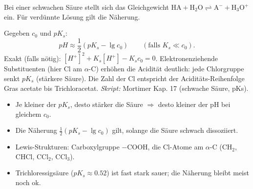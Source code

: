 

Bei einer schwachen Säure stellt sich das Gleichgewicht
$\mathrm{HA}+\mathrm{H_2O}\rightleftharpoons\mathrm{A^-}+\mathrm{H_3O^+}$
ein. Für verdünnte Lösung gilt die Näherung.

\begin{werkzeugkasten}
Gegeben $c_0$ und $pK_s$:
\[
  pH \approx \frac{1}{2}\left(pK_s - \lg c_0\right)
  \qquad(\text{falls } K_s \ll c_0).
\]
Exakt (falls nötig): $[H^+]^2 + K_s[H^+]-K_s c_0 = 0$. Elektronenziehende
Substituenten (hier Cl am $\alpha$-C) erhöhen die Acidität deutlich:
jede Chlorgruppe senkt $pK_s$ (stärkere Säure). Die Zahl der Cl
entspricht der Aciditäts-Reihenfolge Gras acetate bis Trichloracetat.
\textit{Skript:} Mortimer Kap. 17 (schwache Säure, pKs).
\end{werkzeugkasten}

\begin{achtung}
\begin{itemize}
  \item Je kleiner der $pK_s$, desto stärker die Säure $\Rightarrow$ desto
        kleiner der pH bei gleichem $c_0$.
  \item Die Näherung $\frac12(pK_s-\lg c_0)$ gilt, solange die Säure
        schwach dissoziiert.
  \item Lewis-Strukturen: Carboxylgruppe $-\mathrm{COOH}$, die Cl-Atome am
        $\alpha$-C (CH$_2$, CHCl, CCl$_2$, CCl$_3$).
  \item Trichloressigsäure ($pK_s\approx0.52$) ist fast stark sauer; die
        Näherung bleibt meist noch ok.
\end{itemize}
\end{achtung}
